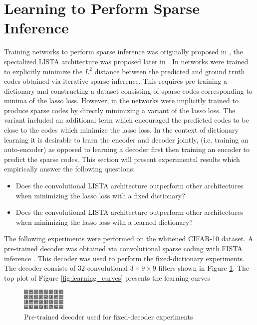 \section{Learning to Perform Sparse Inference} Training networks to perform
sparse inference was originally proposed in \cite{groupSparsity}, the
specialized LISTA architecture was proposed later in \cite{LISTA}. In \cite{LISTA} 
networks were trained to explicitly minimize the $L^2$ distance between
the predicted and ground truth codes obtained via iterative sparse inference. 
This requires pre-training a dictionary and constructing a dataset consisting of 
sparse codes corresponding to minima of the lasso loss. 
However, in \cite{groupSparsity} the networks were implicitly trained to produce sparse
codes by directly minimizing a variant of the lasso loss. The variant included an additional 
term which encouraged the predicted codes to be close to the codes which minimize the lasso loss. 
In the context of dictionary learning it is desirable to learn the encoder and decoder jointly, 
(i.e. training an auto-encoder) as opposed to learning a decoder first then training an encoder to predict
the sparse codes. This section will present experimental results which empirically answer the following questions: 
\begin{itemize} 
\item{Does the convolutional LISTA architecture outperform other architectures when minimizing the lasso loss with a fixed dictionary?} 
\item{Does the convolutional LISTA architecture outperform other architectures when minimizing the lasso loss with a learned dictionary?} 
\end{itemize}
The following experiments were performed on the whitened CIFAR-10 dataset. 
A pre-trained decoder was obtained via convolutional sparse coding with FISTA inference \cite{ConvSC}.
This decoder was used to perform the fixed-dictionary experiments. The decoder consists of 32-convolutional $3\times9\times9$ filters shown in Figure \ref{fig:FISTA_decoder}.  
The top plot of Figure \ref{fig:learning_curves} presents the learning curves  

\begin{figure}
\centering
\includegraphics[scale=2]{./figures/LISTA/FISTA_decoder.png}
\caption{Pre-trained decoder used for fixed-decoder experiments} 
\label{fig:FISTA_decoder} 
\end{figure}  


